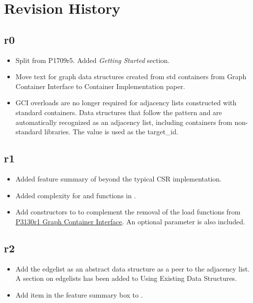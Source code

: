 \section{Revision History}

\subsection*{\paperno r0}

\begin{itemize}
      \item Split from P1709r5. Added \textit{Getting Started} section.
      \item Move text for graph data structures created from std containers from Graph Container Interface to 
            Container Implementation paper.
      \item GCI overloads are no longer required for adjacency lists constructed with standard containers. Data structures that follow
            the pattern  and 
            are automatically recognized as an adjacency list, including containers from non-standard libraries. The 
            value is used as the target\_id.
\end{itemize}

\subsection*{\paperno r1}
\begin{itemize}
      \item Added feature summary of  beyond the typical CSR implementation.
      \item Added complexity for  and  functions in .
      \item Add constructors to  to complement the removal of the load functions from 
            \href{https://www.wg21.link/P3130r1}{P3130r1 Graph Container Interface}. An optional  
            parameter is also included.
\end{itemize}

\subsection*{\paperno r2}

\begin{itemize}
      \item Add the edgelist as an abstract data structure as a peer to the adjacency list. 
            A section on edgelists has been added to Using Existing Data Structures.
      \item Add  item in the feature summary box to .
\end{itemize}
